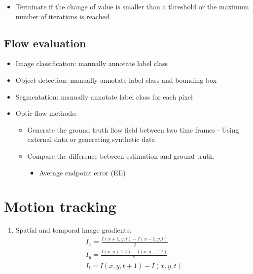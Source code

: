 \documentclass[9pt]{article}
\begin{document}
\begin{multicols*}{2}
\begin{enumerate}
\begin{itemize}
\begin{itemize}
                \item Terminate if the change of value is smaller than a threshold or the maximum number 
                of iterations is reached.
            \end{itemize}
        \end{itemize}
    \end{enumerate}

    \subsection{Flow evaluation}
    \begin{itemize}
        \item Image classification: manually annotate label class
        \item Object detection: manually annotate label class and bounding box
        \item Segmentation: manually annotate label class for each pixel
        \item Optic flow methods:
        \begin{itemize}
            \item Generate the ground truth flow field between two time frames -
            Using external data or generating synthetic data
            \item Compare the difference between estimation and ground truth.
            \begin{itemize}
                \item Average endpoint error (EE)
            \end{itemize}
        \end{itemize}
    \end{itemize}

    \section{Motion tracking}
    \begin{enumerate}
        \item Spatial and temporal image gradients: 
        \begin{gather*}
            I_x = \frac{I(x+1,y,t) - I(x-1,y,t)}{2} \\ 
            I_y = \frac{I(x,y+1,t) - I(x,y-1,t)}{2} \\ 
            I_t = I(x,y,t+1) - I(x,y,t)
        \end{gather*}
    \end{enumerate}


\end{multicols*}
\end{document}
